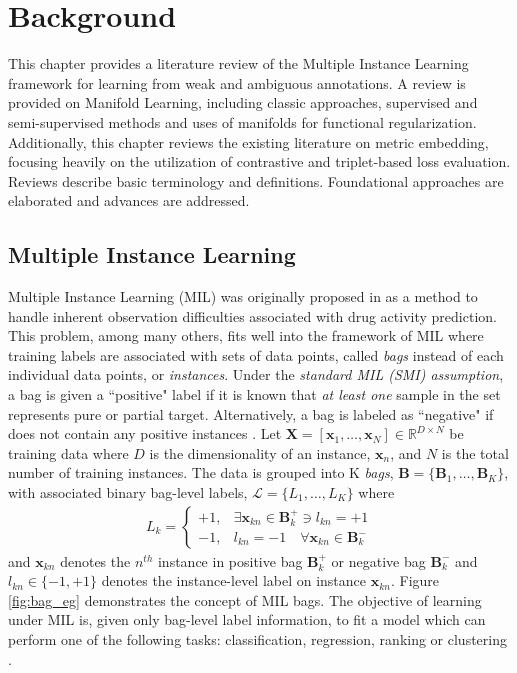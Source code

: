 \chapter{Background}

This chapter provides a literature review of the Multiple Instance Learning framework for learning from weak and ambiguous annotations.  A review is provided on Manifold Learning, including classic approaches, supervised and semi-supervised methods and uses of manifolds for functional regularization. Additionally, this chapter reviews the existing literature on metric embedding, focusing heavily on the utilization of contrastive and triplet-based loss evaluation.  Reviews describe basic terminology and definitions.  Foundational approaches are elaborated and advances are addressed.

\section{Multiple Instance Learning}

Multiple Instance Learning (MIL) was originally proposed in \citep{Dietterich1996AxisParallelRectangles} as a method to handle inherent observation difficulties associated with drug activity prediction.  This problem, among many others, fits well into the framework of MIL where training labels are associated with sets of data points, called \textit{bags} instead of each individual data points, or \textit{instances}.  Under the \textit{standard MIL (SMI) assumption}, a bag is given a ``positive" label if it is known that  \textit{at least one} sample in the set represents pure or partial target.  Alternatively, a bag is labeled as ``negative" if does not contain any positive instances \citep{Carbonneau2016MILSurvey}.  Let $\bm{X}=[\bm{x}_1,\dots, \bm{x}_N] \in \mathbb{R}^{D \times N}$ be training data where $D$ is the dimensionality of an instance, $\bm{x}_n$, and $N$ is the total number of training instances.  The data is grouped into K \textit{bags}, $\bm{B} = \{\bm{B}_1, \dots, \bm{B}_K\}$, with associated binary bag-level labels, $\mathcal{L} = \{L_1, \dots, L_K \}$ where 
\begin{align}
	L_k = \begin{cases} 
	+1, & \exists \bm{x}_{kn} \in \bm{B}^{+}_{k} \ni  l_{kn} = +1\\
	-1, & l_{kn} = -1 \quad \forall \bm{x}_{kn} \in \bm{B}^{-}_{k} 
	\end{cases}
\end{align} and $\bm{x}_{kn}$ denotes the $n^{th}$ instance in positive bag $\bm{B}^{+}_{k}$ or negative bag $\bm{B}^{-}_{k}$ \citep{Zare2016MIACE} and $l_{kn} \in \{ -1, +1\}$ denotes the instance-level label on instance $\bm{x}_{kn}$.  Figure \ref{fig:bag_eg} demonstrates the concept of MIL bags.  The objective of learning under MIL is, given only bag-level label information, to fit a model which can perform one of the following tasks: classification, regression, ranking or clustering \citep{Carbonneau2016MILSurvey}.

